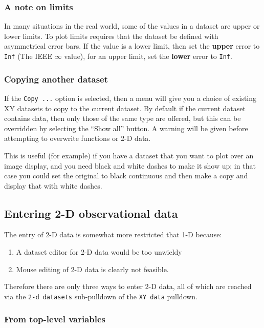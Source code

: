 \documentclass[11pt,twoside,english]{article}
\begin{document}
\subsubsection{A note on limits}


In many situations in the real world, some of the values in a dataset
are upper or lower limits. To plot limits requires that the dataset be
defined with asymmetrical error bars. If the value is a lower limit,
then set the \textbf{upper} error to \texttt{Inf} (The IEEE
$\infty$ value), for an upper limit, set the \textbf{lower} error to
\texttt{Inf}.

\subsubsection{Copying another dataset}
\label{sec:xycopy}

If the \texttt{Copy ...} option is selected, then a menu will give you
a choice of existing XY datasets to copy to the current dataset. By
default if the current dataset contains data, then only those of the
same type are offered, but this can be overridden by selecting the
``Show all'' button. A warning will be given before attempting to
overwrite functions or 2-D data.

This is useful (for example) if you have a dataset that you want to
plot over an image display, and you need black and white dashes to make
it show up; in that case you could set the original to black continuous
and then make a copy and display that with white dashes.


\subsection{Entering 2-D observational data\label{enter-2d}}

The entry of 2-D data is somewhat more restricted that 1-D because:

\begin{enumerate}
\item A dataset editor for 2-D data would be too unwieldy
\item Mouse editing of 2-D data is clearly not feasible.
\end{enumerate}
Therefore there are only three ways to enter 2-D data, all of which are
reached via the \texttt{2-d datasets} sub-pulldown of the \texttt{XY
  data} pulldown.


\subsubsection{From top-level variables }
\end{document}
